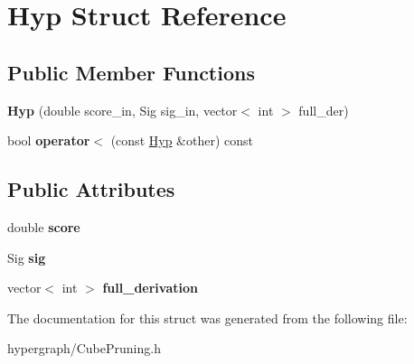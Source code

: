 \hypertarget{struct_hyp}{
\section{Hyp Struct Reference}
\label{struct_hyp}
}
\subsection*{Public Member Functions}
\begin{DoxyCompactItemize}
\item 
\hypertarget{struct_hyp_a5fba7860265cf935133e4c0c73fec090}{
{\bfseries Hyp} (double score\_\-in, Sig sig\_\-in, vector$<$ int $>$ full\_\-der)}
\label{struct_hyp_a5fba7860265cf935133e4c0c73fec090}

\item 
\hypertarget{struct_hyp_a547883a1aa9a7573d328d0f6b385dca8}{
bool {\bfseries operator$<$} (const \hyperlink{struct_hyp}{Hyp} \&other) const }
\label{struct_hyp_a547883a1aa9a7573d328d0f6b385dca8}

\end{DoxyCompactItemize}
\subsection*{Public Attributes}
\begin{DoxyCompactItemize}
\item 
\hypertarget{struct_hyp_a7d24c5a317140b8050dc57255bb7922a}{
double {\bfseries score}}
\label{struct_hyp_a7d24c5a317140b8050dc57255bb7922a}

\item 
\hypertarget{struct_hyp_a4aa96a03dc6b82416074985e0ecd39c3}{
Sig {\bfseries sig}}
\label{struct_hyp_a4aa96a03dc6b82416074985e0ecd39c3}

\item 
\hypertarget{struct_hyp_a076825f81d94a1f2b20bb5141eb9f4c7}{
vector$<$ int $>$ {\bfseries full\_\-derivation}}
\label{struct_hyp_a076825f81d94a1f2b20bb5141eb9f4c7}

\end{DoxyCompactItemize}


The documentation for this struct was generated from the following file:\begin{DoxyCompactItemize}
\item 
hypergraph/CubePruning.h\end{DoxyCompactItemize}

